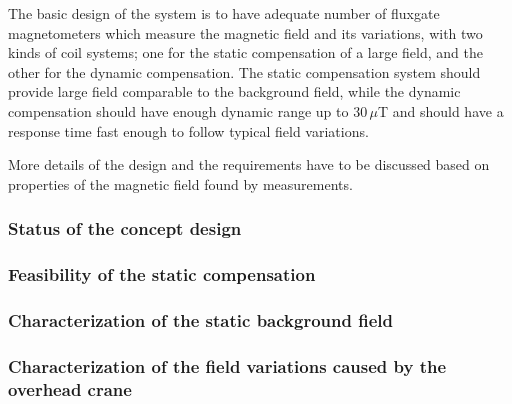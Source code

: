     
    The basic design of the system is to have adequate number of fluxgate magnetometers which measure the magnetic  field and its variations, with two kinds of coil systems; one for the  static compensation of a large field, and the other for the dynamic compensation. The static compensation system should provide large field comparable to the background field, while the dynamic compensation should have enough dynamic range up to $30\,\mu$T and should have a response time fast enough to follow typical field variations.
    
    More details of the design and the requirements have to be discussed based on properties of the magnetic field found by measurements. 

\subsubsection{Status of the concept design}
\subsubsection*{Feasibility of the static compensation}
\subsubsection*{Characterization of the static background field}
\subsubsection*{Characterization of the field variations caused by the overhead crane}






